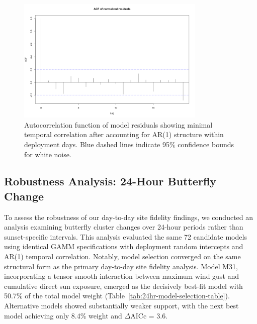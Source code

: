 \begin{figure}[htbp]
    \centering
    \includegraphics[width=0.8\textwidth]{supplemental/results/sunset/figures/diag_acf.png}
    \caption{Autocorrelation function of model residuals showing minimal temporal correlation after accounting for AR(1) structure within deployment days. Blue dashed lines indicate 95\% confidence bounds for white noise.}
    \label{fig:acf_diagnostics_sunset}
\end{figure}

\subsection{Robustness Analysis: 24-Hour Butterfly Change}

To assess the robustness of our day-to-day site fidelity findings, we conducted an analysis examining butterfly cluster changes over 24-hour periods rather than sunset-specific intervals. This analysis evaluated the same 72 candidate models using identical GAMM specifications with deployment random intercepts and AR(1) temporal correlation. Notably, model selection converged on the same structural form as the primary day-to-day site fidelity analysis. Model M31, incorporating a tensor smooth interaction between maximum wind gust and cumulative direct sun exposure, emerged as the decisively best-fit model with 50.7\% of the total model weight (Table~\ref{tab:24hr-model-selection-table}). Alternative models showed substantially weaker support, with the next best model achieving only 8.4\% weight and $\Delta$AICc = 3.6.



